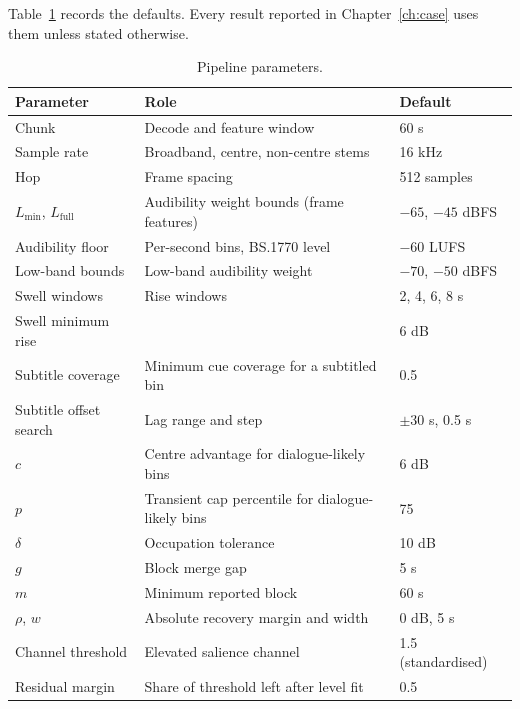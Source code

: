 Table~\ref{tab:params} records the defaults. Every result reported in Chapter~\ref{ch:case} uses them unless stated otherwise.

\begin{table}[htbp]\centering\small
\begin{tabularx}{\linewidth}{lXl}
\toprule
Parameter & Role & Default \\
\midrule
Chunk & Decode and feature window & 60 s \\
Sample rate & Broadband, centre, non-centre stems & 16 kHz \\
Hop & Frame spacing & 512 samples \\
$L_{\min}$, $L_{\text{full}}$ & Audibility weight bounds (frame features) & $-65$, $-45$ dBFS \\
Audibility floor & Per-second bins, BS.1770 level & $-60$ LUFS \\
Low-band bounds & Low-band audibility weight & $-70$, $-50$ dBFS \\
Swell windows & Rise windows & 2, 4, 6, 8 s \\
Swell minimum rise & & 6 dB \\
Subtitle coverage & Minimum cue coverage for a subtitled bin & 0.5 \\
Subtitle offset search & Lag range and step & $\pm30$ s, 0.5 s \\
$c$ & Centre advantage for dialogue-likely bins & 6 dB \\
$p$ & Transient cap percentile for dialogue-likely bins & 75 \\
$\delta$ & Occupation tolerance & 10 dB \\
$g$ & Block merge gap & 5 s \\
$m$ & Minimum reported block & 60 s \\
$\rho$, $w$ & Absolute recovery margin and width & 0 dB, 5 s \\
Channel threshold & Elevated salience channel & 1.5 (standardised) \\
Residual margin & Share of threshold left after level fit & 0.5 \\
\bottomrule
\end{tabularx}
\caption{Pipeline parameters.}\label{tab:params}
\end{table}
